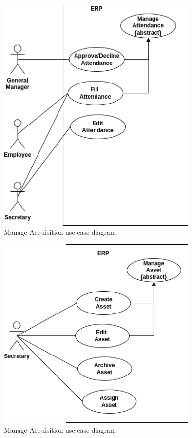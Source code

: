 \begin{figure}[!ht]
\centering
\includegraphics[width=10cm,keepaspectratio]{usecases/attendance.drawio.png}
\caption{Manage Acquisition use case diagram }
\end{figure}

\begin{figure}[!ht]
\centering
\includegraphics[width=10cm,keepaspectratio]{usecases/asset.drawio.png}
\caption{Manage Acquisition use case diagram }
\end{figure}

